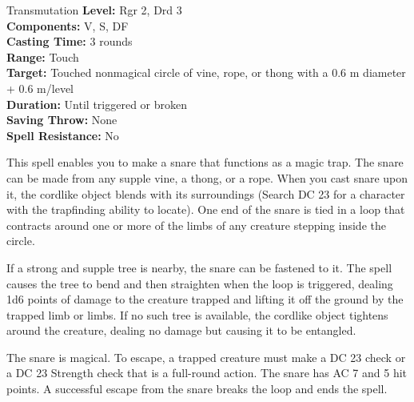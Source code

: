 {Transmutation}
{
	\textbf{Level:}
	Rgr 2, Drd 3\\
	\textbf{Components:}
	V, S, DF\\
	\textbf{Casting Time:}
	3 rounds\\
	\textbf{Range:}
	Touch\\
	\textbf{Target:}
	Touched nonmagical circle of vine, rope, or thong with a 0.6 m diameter + 0.6 m/level\\
	\textbf{Duration:}
	Until triggered or broken\\
	\textbf{Saving Throw:}
	None\\
	\textbf{Spell Resistance:}
	No\\
}
{
	This spell enables you to make a snare that functions as a magic trap. The snare can be made from any supple vine, a thong, or a rope. When you cast snare upon it, the cordlike object blends with its surroundings (Search DC 23 for a character with the trapfinding ability to locate). One end of the snare is tied in a loop that contracts around one or more of the limbs of any creature stepping inside the circle.

	If a strong and supple tree is nearby, the snare can be fastened to it. The spell causes the tree to bend and then straighten when the loop is triggered, dealing 1d6 points of damage to the creature trapped and lifting it off the ground by the trapped limb or limbs. If no such tree is available, the cordlike object tightens around the creature, dealing no damage but causing it to be entangled.

	The snare is magical. To escape, a trapped creature must make a DC 23  check or a DC 23 Strength check that is a full-round action. The snare has AC 7 and 5 hit points. A successful escape from the snare breaks the loop and ends the spell.

}
